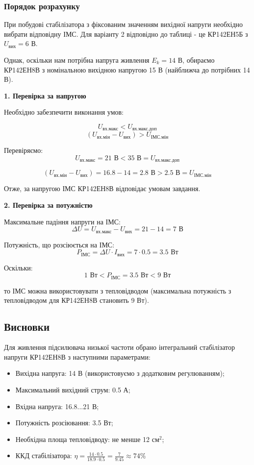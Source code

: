 \documentclass[main.tex]{subfiles}
\begin{document}
\subsubsection{Порядок розрахунку}

При побудові стабілізатора з фіксованим значенням вихідної напруги необхідно вибрати відповідну ІМС. Для варіанту 2 відповідно до таблиці - це КР142ЕН5Б з $U_{\text{вих}} = 6$ В.

Однак, оскільки нам потрібна напруга живлення $E_k = 14$ В, обираємо КР142ЕН8В з номінальною вихідною напругою 15 В (найближча до потрібних 14 В).

\textbf{1. Перевірка за напругою}

Необхідно забезпечити виконання умов:

\[
U_{\text{вх.макс}} < U_{\text{вх.макс.доп}}
\]
\[
(U_{\text{вх.мін}} - U_{\text{вих}}) > U_{\text{ІМС.мін}}
\]


Перевіряємо:
\[U_{\text{вх.макс}} = 21\text{ В} < 35\text{ В} = U_{\text{вх.макс.доп}}\]

\[(U_{\text{вх.мін}} - U_{\text{вих}}) = 16.8 - 14 = 2.8\text{ В} > 2.5\text{ В} = U_{\text{ІМС.мін}}\]

Отже, за напругою ІМС КР142ЕН8В відповідає умовам завдання.

\textbf{2. Перевірка за потужністю}

Максимальне падіння напруги на ІМС:
\[\Delta U = U_{\text{вх.макс}} - U_{\text{вих}} = 21 - 14 = 7\text{ В}\]

Потужність, що розсіюється на ІМС:
\[P_{\text{ІМС}} = \Delta U \cdot I_{\text{вих}} = 7 \cdot 0.5 = 3.5\text{ Вт}\]

Оскільки:
\[1\text{ Вт} < P_{\text{ІМС}} = 3.5\text{ Вт} < 9\text{ Вт}\]

то ІМС можна використовувати з тепловідводом (максимальна потужність з тепловідводом для КР142ЕН8В становить 9 Вт).

\subsection{Висновки}

Для живлення підсилювача низької частоти обрано інтегральний стабілізатор напруги КР142ЕН8В з наступними параметрами:
\begin{itemize}
    \item Вихідна напруга: 14 В (використовуємо з додатковим регулюванням);
    \item Максимальний вихідний струм: 0.5 А;
    \item Вхідна напруга: 16.8...21 В;
    \item Потужність розсіювання: 3.5 Вт;
    \item Необхідна площа тепловідводу: не менше 12 см$^2$;
    \item ККД стабілізатора: $\eta = \frac{14 \cdot 0.5}{18.9 \cdot 0.5} = \frac{7}{9.45} \approx 74\%$
\end{itemize}
\end{document}
